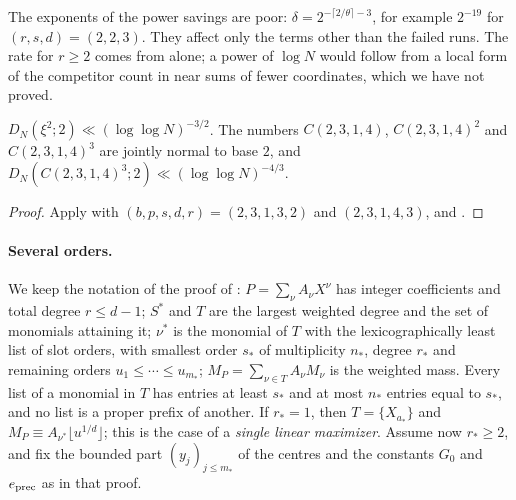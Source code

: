 \documentclass[11pt]{article}
\begin{document}
The exponents of the power savings are poor: $\delta=2^{-\lceil2/\theta\rceil-3}$, for example
$2^{-19}$ for $(r,s,d)=(2,2,3)$. They affect only the terms other than the failed runs. The rate for
$r\ge2$ comes from  alone; a power of $\log N$ would follow from a local form of the
competitor count in  near sums of fewer coordinates, which we have not proved.

\begin{corollary}\label{cor:flagship2}
$D_N(\xi^2;2)\ll(\log\log N)^{-3/2}$. The numbers $C(2,3,1,4)$, $C(2,3,1,4)^2$ and $C(2,3,1,4)^3$ are jointly
normal to base $2$, and $D_N(C(2,3,1,4)^3;2)\ll(\log\log N)^{-4/3}$.
\end{corollary}

\begin{proof}
Apply  with $(b,p,s,d,r)=(2,3,1,3,2)$ and $(2,3,1,4,3)$, and .
\end{proof}

\paragraph{Several orders.} We keep the notation of the proof of : $P=\sum_\nu A_\nu X^\nu$
has integer coefficients and total degree $r\le d-1$; $S^*$ and $T$ are the largest weighted degree and the
set of monomials attaining it; $\nu^*$ is the monomial of $T$ with the lexicographically least list of
slot orders, with smallest order $s_*$ of multiplicity $n_*$, degree $r_*$ and remaining orders
$u_1\le\cdots\le u_{m_*}$; $M_P=\sum_{\nu\in T}A_\nu M_\nu$ is the weighted mass. Every list of a monomial in
$T$ has entries at least $s_*$ and at most $n_*$ entries equal to $s_*$, and no list is a proper prefix of
another. If $r_*=1$, then $T=\{X_{a_*}\}$ and $M_P\equiv A_{\nu^*}\lfloor u^{1/d}\rfloor$; this is the case of a
\emph{single linear maximizer}. Assume now $r_*\ge2$, and fix the bounded part $(y_j)_{j\le m_*}$ of the centres
and the constants $G_0$ and $e_{\rm prec}$ as in that proof.
\end{document}
